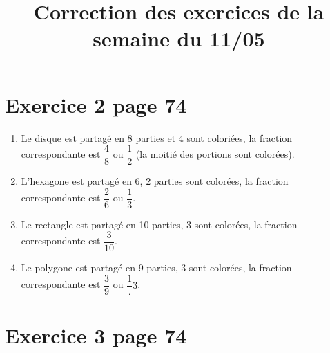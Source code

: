 \documentclass[12pt,a4paper]{article}
\title{Correction des exercices de la semaine du 11/05}
\date{}
\begin{document}
	
\maketitle


\section*{Exercice 2 page 74}

\begin{enumerate}
	\item Le disque est partagé en 8 parties et 4 sont coloriées, la fraction correspondante est $\dfrac{4}{8}$ ou $\dfrac{1}{2}$ (la moitié des portions sont colorées).
	
	\item L'hexagone est partagé en 6, 2 parties sont colorées, la fraction correspondante est $\dfrac{2}{6}$ ou $\dfrac{1}{3}$.
	
	\item Le rectangle est partagé en 10 parties, 3 sont colorées, la fraction correspondante est $\dfrac{3}{10}$.
	
	\item Le polygone est partagé en 9 parties, 3 sont colorées, la fraction correspondante est $\dfrac{3}{9}$ ou $\dfrac{1}.{3}$.
\end{enumerate}

\section*{Exercice 3 page 74}
\end{document}
